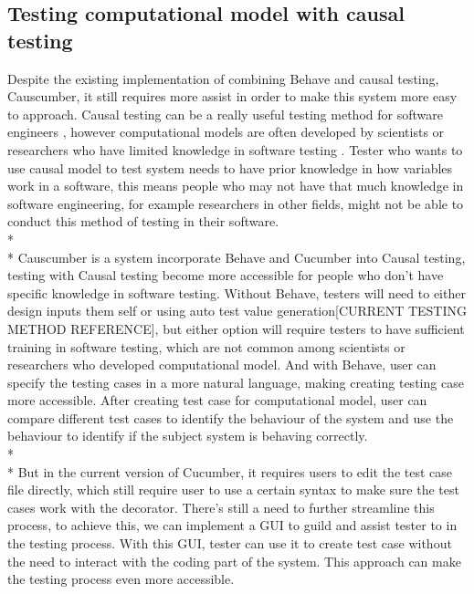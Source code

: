 \subsection{Testing computational model with causal testing}
Despite the existing implementation of combining Behave and causal testing, Causcumber, it still requires more assist in order to make this system more easy to approach. Causal testing can be a really useful testing method for software engineers \cite{Reference13}, however computational models are often developed by scientists or researchers who have limited knowledge in software testing \cite{Reference8}. Tester who wants to use causal model to test system needs to have prior knowledge in how variables work in a software, this means people who may not have that much knowledge in software engineering, for example researchers in other fields, might not be able to conduct this method of testing in their software. \\*\\*
Causcumber is a system incorporate Behave and Cucumber into Causal testing, testing with Causal testing become more accessible for people who don’t have specific knowledge in software testing. Without Behave, testers will need to either design inputs them self or using auto test value generation[CURRENT TESTING METHOD REFERENCE], but either option will require testers to have sufficient training in software testing, which are not common among scientists or researchers who developed computational model. And with Behave, user can specify the testing cases in a more natural language, making creating testing case more accessible. After creating test case for computational model, user can compare different test cases to identify the behaviour of the system and use the behaviour to identify if the subject system is behaving correctly.\\*\\*
But in the current version of Cucumber, it requires users to edit the test case file directly, which still require user to use a certain syntax to make sure the test cases work with the decorator. There’s still a need to further streamline this process, to achieve this, we can implement a GUI to guild and assist tester to in the testing process. With this GUI, tester can use it to create test case without the need to interact with the coding part of the system. This approach can make the testing process even more accessible.


